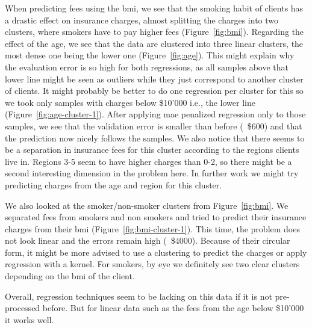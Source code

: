 \documentclass[10pt]{article}
\newenvironment{exercise}[2][Exercise]{\begin{trivlist}
  \item[\hskip \labelsep {\bfseries #1}\hskip \labelsep {\bfseries #2.}]}{\end{trivlist}}
\begin{document}
\begin{exercise}{8}
When predicting fees using the bmi, we see that the smoking habit of clients has a drastic effect on insurance charges, almost splitting the charges into two clusters, where smokers have to pay higher fees (Figure~\ref{fig:bmi}). Regarding the effect of the age, we see that the data are clustered into three linear clusters, the most dense one being the lower one (Figure~\ref{fig:age}). This might explain why the evaluation error is so high for both regressions, as all samples above that lower line might be seen as outliers while they just correspond to another cluster of clients. It might probably be better to do one regression per cluster for this so we took only samples with charges below \$10'000 i.e., the lower line (Figure~\ref{fig:age-cluster-1}). After applying mae penalized regression only to those samples, we see that the validation error is smaller than before (~\$600) and that the prediction now nicely follows the samples. We also notice that there seems to be a separation in insurance fees for this cluster according to the regions clients live in. Regions 3-5 seem to have higher charges than 0-2, so there might be a second interesting dimension in the problem here. In further work we might try predicting charges from the age and region for this cluster. 

We also looked at the smoker/non-smoker clusters from Figure~\ref{fig:bmi}. We separated fees from smokers and non smokers and tried to predict their insurance charges from their bmi (Figure~\ref{fig:bmi-cluster-1}). This time, the problem does not look linear and the errors remain high (~\$4000). Because of their circular form, it might be more advised to use a clustering to predict the charges or apply regression with a kernel. For smokers, by eye we definitely see two clear clusters depending on the bmi of the client.


Overall, regression techniques seem to be lacking on this data if it is not pre-processed before. But for linear data such as the fees from the age below \$10'000 it works well.  





\end{exercise}
\end{document}
